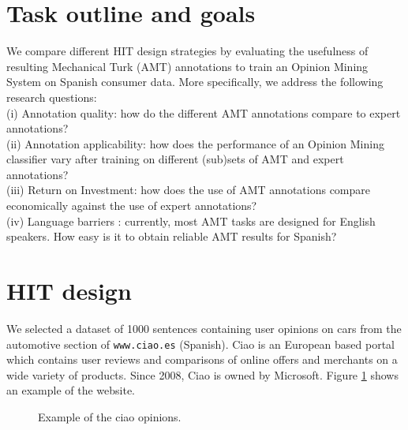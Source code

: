 \documentclass[11pt, a4paper,onecolumn]{article}
\begin{document}
\section{Task outline and goals}
\label{sect:outline} 

We compare different HIT design strategies by evaluating the usefulness of resulting Mechanical Turk (AMT) annotations to train an Opinion Mining System on Spanish consumer data. More specifically, we address the following research questions:\\
 \indent (i) Annotation quality: how do the different AMT annotations compare to expert annotations?\\
 \indent (ii) Annotation applicability: how does the performance of an Opinion Mining classifier vary after training on different (sub)sets of AMT and expert annotations?\\
 \indent (iii) Return on Investment: how does the use of AMT annotations compare economically against the use of expert annotations?\\
 \indent (iv) Language barriers \cite{irvine-klementiev:2010:MTURK}: currently, most AMT tasks are designed for English speakers. How easy is it to obtain reliable AMT results for Spanish? 

\section{HIT design}
\label{sect:design}

We selected a dataset of 1000 sentences containing user opinions on cars from the automotive section of \texttt{www.ciao.es} (Spanish). Ciao is an European based portal which contains user reviews and comparisons of online offers and merchants on a wide variety of products. Since 2008, Ciao is owned by Microsoft. Figure \ref{ciao} shows an example of the website. 
 


\begin{figure}[ht]
  \begin{center}
	\caption{Example of the ciao opinions.}
	\label{ciao}
  \end{center}
\end{figure}
\end{document}
